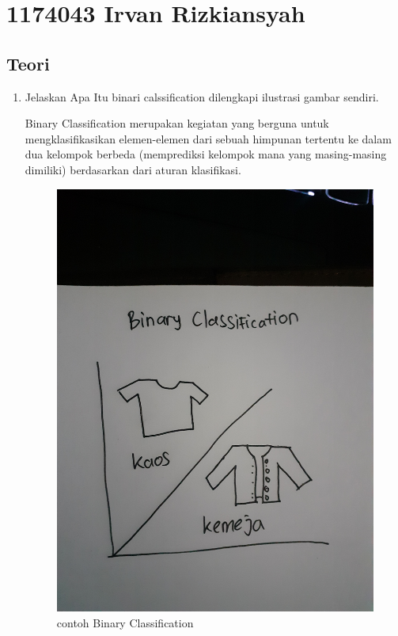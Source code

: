 \section{1174043 Irvan Rizkiansyah}

	\subsection{Teori}
	\begin{enumerate}
		\item Jelaskan Apa Itu binari calssification dilengkapi ilustrasi gambar sendiri.\par
		Binary Classification merupakan kegiatan yang berguna untuk mengklasifikasikan elemen-elemen dari sebuah himpunan tertentu ke dalam dua kelompok berbeda (memprediksi kelompok mana yang masing-masing dimiliki) berdasarkan dari aturan klasifikasi.
		\begin{figure}[ht]
			\centering
			\includegraphics[scale=0.01]{figures/1174043/chapter2/1.jpg}
			\caption{contoh Binary Classification}
			\label{contoh}
		\end{figure}
		

\end{enumerate}
